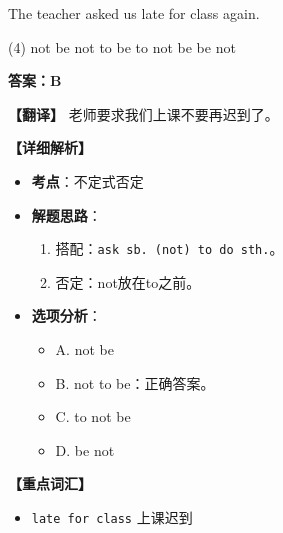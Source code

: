 \documentclass[11pt, a4paper]{article}
\newcommand{\analysis}[4]{
    \begin{solutionbox}
        \textbf{答案：#1}
        
        \textbf{【翻译】} #2
        
        \textbf{【详细解析】}
        #3
        
        \textbf{【重点词汇】}
        #4
    \end{solutionbox}
}
\newcommand{\blank}{\underline{\hspace{1.5cm}}}
\begin{document}
\begin{questions}
    \item The teacher asked us \blank late for class again.
    \begin{tasks}(4)
        \task not be \task not to be \task to not be \task be not
    \end{tasks}
    \analysis{B}{老师要求我们上课不要再迟到了。}{
        \begin{itemize}
            \item \textbf{考点}：不定式否定
            \item \textbf{解题思路}：
                \begin{enumerate}
                    \item 搭配：\texttt{ask sb. (not) to do sth.}。
                    \item 否定：not放在to之前。
                \end{enumerate}
            \item \textbf{选项分析}：
                \begin{itemize}
                    \item A. not be
                    \item B. not to be：正确答案。
                    \item C. to not be
                    \item D. be not
                \end{itemize}
        \end{itemize}
    }{
        \begin{itemize}
            \item \texttt{late for class} 上课迟到
        \end{itemize}
    }


\end{questions}
\end{document}
